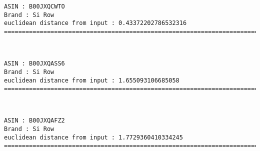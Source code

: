 \documentclass[11pt]{article}
\begin{document}
    \begin{Verbatim}[commandchars=\\\{\}]
ASIN : B00JXQCWTO
Brand : Si Row
euclidean distance from input : 0.43372202786532316
=============================================================================================================================

    \end{Verbatim}

    
    
    \begin{center}
    \end{center}
    { \hspace*{\fill} \\}
    
    \begin{Verbatim}[commandchars=\\\{\}]
ASIN : B00JXQASS6
Brand : Si Row
euclidean distance from input : 1.655093106685058
=============================================================================================================================

    \end{Verbatim}

    
    
    \begin{center}
    \end{center}
    { \hspace*{\fill} \\}
    
    \begin{Verbatim}[commandchars=\\\{\}]
ASIN : B00JXQAFZ2
Brand : Si Row
euclidean distance from input : 1.7729360410334245
=============================================================================================================================

    \end{Verbatim}

    
    
    \begin{center}
    \end{center}
    { \hspace*{\fill} \\}
    
\end{document}

